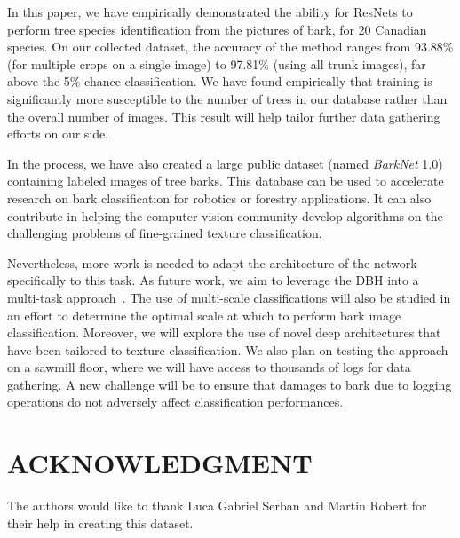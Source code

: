 \documentclass[letterpaper, 10 pt, conference]{ieeeconf}  %
\begin{document}
In this paper, we have empirically demonstrated the ability for ResNets to perform tree species identification from the pictures of bark, for 20 Canadian species. On our collected dataset, the accuracy of the method ranges from 93.88\% (for multiple crops on a single image) to 97.81\% (using all trunk images), far above the 5\% chance classification. We have found empirically that training is significantly more susceptible to the number of trees in our database rather than the overall number of images. This result will help tailor further data gathering efforts on our side.

In the process, we have also created a large public dataset (named \emph{BarkNet} 1.0) containing labeled images of tree barks. This database can be used to accelerate research on bark classification for robotics or forestry applications. It can also contribute in helping the computer vision community develop algorithms on the challenging problems of fine-grained texture classification.

Nevertheless, more work is needed to adapt the architecture of the network specifically to this task. As future work, we aim to leverage the DBH into a multi-task approach~\cite{Trottier2017}. The use of multi-scale classifications will also be studied in an effort to determine the optimal scale at which to perform bark image classification. Moreover, we will explore the use of novel deep architectures that have been tailored to texture classification. We also plan on testing the approach on a sawmill floor, where we will have access to thousands of logs for data gathering. A new challenge will be to ensure that damages to bark due to logging operations do not adversely affect classification performances.

\addtolength{\textheight}{-8.4cm}   %








\section*{ACKNOWLEDGMENT}

The authors would like to thank Luca Gabriel Serban and Martin Robert for their help in creating this dataset.






\end{document}
